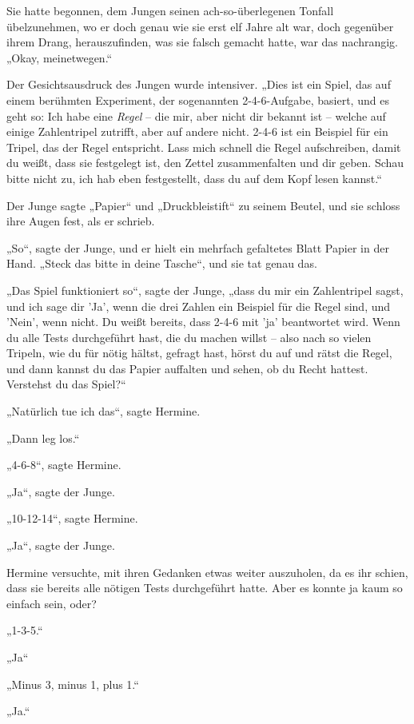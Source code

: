 {Sie hatte begonnen, dem Jungen seinen ach-so-überlegenen Tonfall übelzunehmen, wo er doch genau wie sie erst elf Jahre alt war, doch gegenüber ihrem Drang, herauszufinden, was sie falsch gemacht hatte, war das nachrangig. „Okay, meinetwegen.“

Der Gesichtsausdruck des Jungen wurde intensiver. „Dies ist ein Spiel, das auf einem berühmten Experiment, der sogenannten 2-4-6-Aufgabe, basiert, und es geht so: Ich habe eine \emph{Regel} -- die mir, aber nicht dir bekannt ist -- welche auf einige Zahlentripel zutrifft, aber auf andere nicht. 2-4-6 ist ein Beispiel für ein Tripel, das der Regel entspricht. Lass mich schnell die Regel aufschreiben, damit du weißt, dass sie festgelegt ist, den Zettel zusammenfalten und dir geben. Schau bitte nicht zu, ich hab eben festgestellt, dass du auf dem Kopf lesen kannst.“

Der Junge sagte „Papier“ und „Druckbleistift“ zu seinem Beutel, und sie schloss ihre Augen fest, als er schrieb.

„So“, sagte der Junge, und er hielt ein mehrfach gefaltetes Blatt Papier in der Hand. „Steck das bitte in deine Tasche“, und sie tat genau das.

„Das Spiel funktioniert so“, sagte der Junge, „dass du mir ein Zahlentripel sagst, und ich sage dir 'Ja', wenn die drei Zahlen ein Beispiel für die Regel sind, und 'Nein', wenn nicht. Du weißt bereits, dass 2-4-6 mit 'ja' beantwortet wird. Wenn du alle Tests durchgeführt hast, die du machen willst -- also nach so vielen Tripeln, wie du für nötig hältst, gefragt hast, hörst du auf und rätst die Regel, und dann kannst du das Papier auffalten und sehen, ob du Recht hattest. Verstehst du das Spiel?“

„Natürlich tue ich das“, sagte Hermine.

„Dann leg los.“

„4-6-8“, sagte Hermine.

„Ja“, sagte der Junge.

„10-12-14“, sagte Hermine.

„Ja“, sagte der Junge.

Hermine versuchte, mit ihren Gedanken etwas weiter auszuholen, da es ihr schien, dass sie bereits alle nötigen Tests durchgeführt hatte. Aber es konnte ja kaum so einfach sein, oder?

„1-3-5.“

„Ja“

„Minus 3, minus 1, plus 1.“

„Ja.“

}
